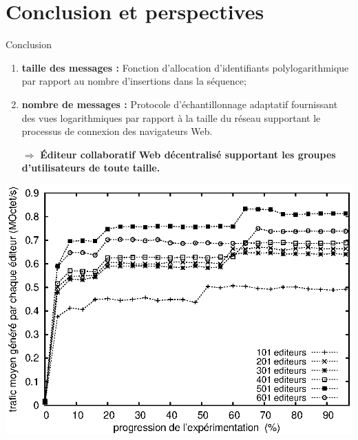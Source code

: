 \section{Conclusion et perspectives}

  



\begin{frame}{Conclusion}

  \begin{enumerate}
  \item \textbf{taille des messages :} Fonction d'allocation d'identifiants
    polylogarithmique par rapport au nombre d'insertions dans la séquence;
    \vspace{0.2cm}
  \item \textbf{nombre de messages :} Protocole d'échantillonnage adaptatif
    fournissant des vues logarithmiques par rapport à la taille du réseau
    supportant le processus de connexion des navigateurs Web.
  \end{enumerate}

  \vspace{0.6cm}\hspace{-1cm}
  \begin{minipage}{0.52\textwidth}
    \large
    \begin{itemize}
    \item [$\Rightarrow$] \textbf{Éditeur collaboratif Web décentralisé supportant les
        groupes d'utilisateurs de toute taille.}
    \end{itemize}
  \end{minipage}
  \begin{minipage}{0.47\textwidth}
      \includegraphics[width=1.4\textwidth]{img/editor/communication.eps}
  \end{minipage}

\end{frame}


